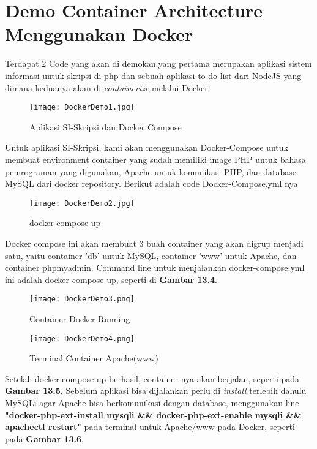 \section{Demo Container Architecture Menggunakan Docker}
Terdapat 2 Code yang akan di demokan,yang pertama merupakan aplikasi sistem informasi untuk skripsi di php dan sebuah aplikasi to-do list dari NodeJS yang dimana keduanya akan di \textit{containerize} melalui Docker.


\begin{figure}[h!]
	\begin{center}
	\texttt{[image: DockerDemo1.jpg]}
	\caption{Aplikasi SI-Skripsi dan Docker Compose}
	\label{fig:DockerDemo1}
	\end{center}
\end{figure}

Untuk aplikasi SI-Skripsi, kami akan menggunakan Docker-Compose untuk membuat environment container yang sudah memiliki image PHP untuk bahasa pemrograman yang digunakan, Apache untuk komunikasi PHP, dan database MySQL dari docker repository. Berikut adalah code Docker-Compose.yml nya

\begin{figure}[h]
	\centering
	\texttt{[image: DockerDemo2.jpg]}
	\caption{docker-compose up}
	\label{fig:DockerDemo2}
	
\end{figure}
Docker compose ini akan membuat 3 buah container yang akan digrup menjadi satu, yaitu container 'db' untuk MySQL, container 'www' untuk Apache, dan container phpmyadmin. Command line untuk menjalankan docker-compose.yml ini adalah docker-compose up, seperti di \textbf{Gambar 13.4}. \pagebreak

\begin{figure}[h!]
	\begin{center}
		\texttt{[image: DockerDemo3.png]}
		\caption{Container Docker Running}
		\label{fig:DockerDemo3}
	\end{center}
\end{figure}

\begin{figure}[h!]
	\begin{center}
		\texttt{[image: DockerDemo4.png]}
		\caption{Terminal Container Apache(www)}
		\label{fig:DockerDemo4}
	\end{center}
\end{figure}

Setelah docker-compose up berhasil, container nya akan berjalan, seperti pada \textbf{Gambar 13.5}. Sebelum aplikasi bisa dijalankan perlu di \textit{install} terlebih dahulu MySQLi agar Apache bisa berkomunikasi dengan database, menggunakan line \textbf{"docker-php-ext-install mysqli \&\& docker-php-ext-enable mysqli \&\& apachectl restart"} pada terminal untuk Apache/www pada Docker, seperti pada \textbf{Gambar 13.6}.


